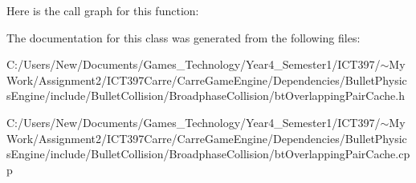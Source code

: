 Here is the call graph for this function:

The documentation for this class was generated from the following files:\begin{CompactItemize}
\item 
C:/Users/New/Documents/Games\_\-Technology/Year4\_\-Semester1/ICT397/$\sim$My Work/Assignment2/ICT397Carre/CarreGameEngine/Dependencies/BulletPhysicsEngine/include/BulletCollision/BroadphaseCollision/btOverlappingPairCache.h\item 
C:/Users/New/Documents/Games\_\-Technology/Year4\_\-Semester1/ICT397/$\sim$My Work/Assignment2/ICT397Carre/CarreGameEngine/Dependencies/BulletPhysicsEngine/include/BulletCollision/BroadphaseCollision/btOverlappingPairCache.cpp\end{CompactItemize}
